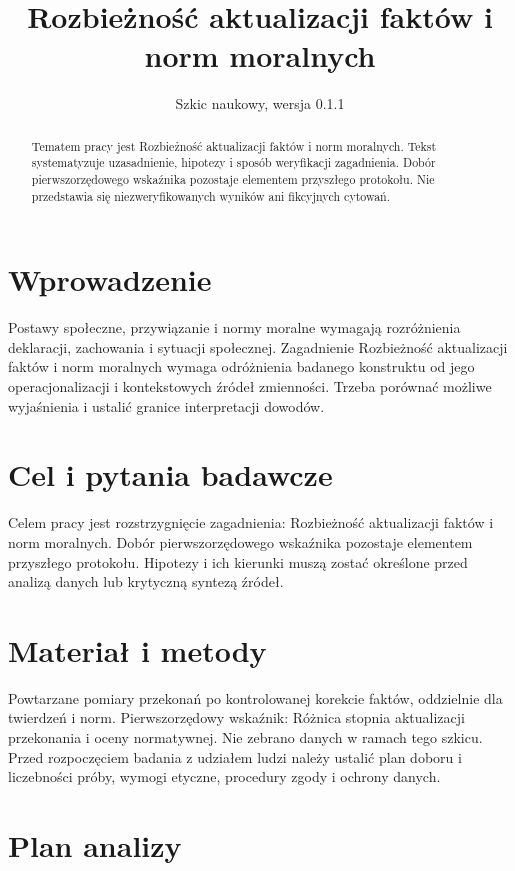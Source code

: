 \documentclass[11pt,a4paper]{article}
\title{Rozbieżność aktualizacji faktów i norm moralnych}
\author{}
\date{Szkic naukowy, wersja 0.1.1}
\begin{document}
\maketitle

\begin{abstract}

Tematem pracy jest Rozbieżność aktualizacji faktów i norm moralnych. Tekst systematyzuje uzasadnienie, hipotezy i sposób weryfikacji zagadnienia. Dobór pierwszorzędowego wskaźnika pozostaje elementem przyszłego protokołu. Nie przedstawia się niezweryfikowanych wyników ani fikcyjnych cytowań.

\end{abstract}

\section{Wprowadzenie}

Postawy społeczne, przywiązanie i normy moralne wymagają rozróżnienia deklaracji, zachowania i sytuacji społecznej. Zagadnienie Rozbieżność aktualizacji faktów i norm moralnych wymaga odróżnienia badanego konstruktu od jego operacjonalizacji i kontekstowych źródeł zmienności. Trzeba porównać możliwe wyjaśnienia i ustalić granice interpretacji dowodów.

\section{Cel i pytania badawcze}

Celem pracy jest rozstrzygnięcie zagadnienia: Rozbieżność aktualizacji faktów i norm moralnych. Dobór pierwszorzędowego wskaźnika pozostaje elementem przyszłego protokołu. Hipotezy i ich kierunki muszą zostać określone przed analizą danych lub krytyczną syntezą źródeł.

\section{Materiał i metody}

Powtarzane pomiary przekonań po kontrolowanej korekcie faktów, oddzielnie dla twierdzeń i norm. Pierwszorzędowy wskaźnik: Różnica stopnia aktualizacji przekonania i oceny normatywnej. Nie zebrano danych w ramach tego szkicu. Przed rozpoczęciem badania z udziałem ludzi należy ustalić plan doboru i liczebności próby, wymogi etyczne, procedury zgody i ochrony danych.

\section{Plan analizy}
\end{document}
